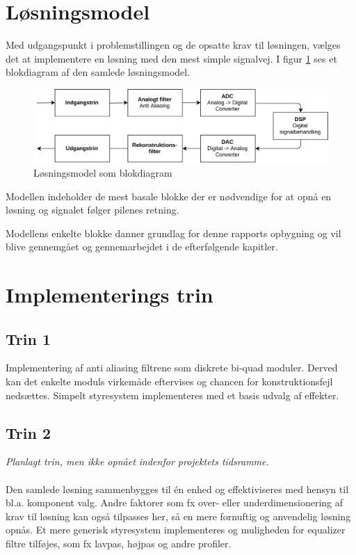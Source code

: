 \section{Løsningsmodel}
Med udgangspunkt i problemstillingen og de opsatte krav til løsningen, vælges det at implementere en løsning med den mest simple signalvej.
I figur \ref{fig:model} ses et blokdiagram af den samlede løsningsmodel.

\begin{figure}[H]
	\centering
	\includegraphics[width=.9\textwidth]{billeder/model.png}
	\caption{Løsningsmodel som blokdiagram}
	\label{fig:model}
\end{figure}

Modellen indeholder de mest basale blokke der er nødvendige for at opnå en løsning og signalet følger pilenes retning.

Modellens enkelte blokke danner grundlag for denne rapports opbygning og vil blive gennemgået og gennemarbejdet i de efterfølgende kapitler.


\section{Implementerings trin}

\subsection{Trin 1}
Implementering af anti aliasing filtrene som diskrete bi-quad moduler. 
Derved kan det enkelte moduls virkemåde eftervises og chancen for konstruktionsfejl nedsættes.
Simpelt styresystem implementeres med et basis udvalg af effekter.

\subsection{Trin 2}
\textit{Planlagt trin, men ikke opnået indenfor projektets tidsramme.}
\\
\\
Den samlede løsning sammenbygges til én enhed og effektiviseres med hensyn til bl.a. komponent valg. 
Andre faktorer som fx over- eller underdimensionering af krav til løsning kan også tilpasses her, så en mere fornuftig og anvendelig løsning opnås.
Et mere generisk styresystem implementeres og muligheden for equalizer filtre tilføjes, som fx lavpas, højpas og andre profiler. 
